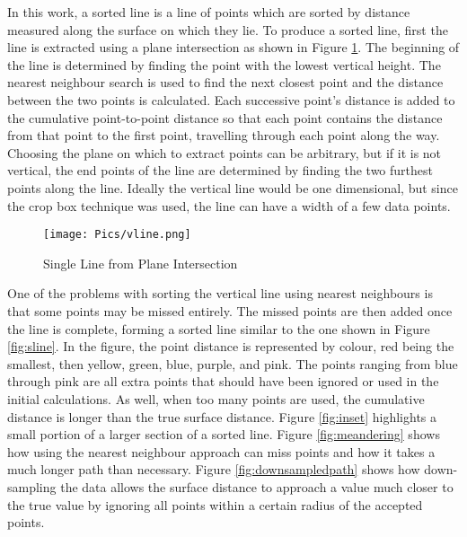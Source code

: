 In this work, a sorted line is a line of points which are sorted by distance measured along the surface on which they lie. To produce a sorted line, first the line is extracted using a plane intersection as shown in Figure \ref{fig:vline}. The beginning of the line is determined by finding the point with the lowest vertical height. The nearest neighbour search is used to find the next closest point and the distance between the two points is calculated. Each successive point's distance is added to the cumulative point-to-point distance so that each point contains the distance from that point to the first point, travelling through each point along the way. Choosing the plane on which to extract points can be arbitrary, but if it is not vertical, the end points of the line are determined by finding the two furthest points along the line. Ideally the vertical line would be one dimensional, but since the crop box technique was used, the line can have a width of a few data points.
\begin{figure}[!htb]
    \centering
    \texttt{[image: Pics/vline.png]}
    \caption{Single Line from Plane Intersection}
    \label{fig:vline}
\end{figure}
\clearpage
One of the problems with sorting the vertical line using nearest neighbours is that some points may be missed entirely. The missed points are then added once the line is complete, forming a sorted line similar to the one shown in Figure \ref{fig:sline}. In the figure, the point distance is represented by colour, red being the smallest, then yellow, green, blue, purple, and pink. The points ranging from blue through pink are all extra points that should have been ignored or used in the initial calculations. As well, when too many points are used, the cumulative distance is longer than the true surface distance. Figure \ref{fig:inset} highlights a small portion of a larger section of a sorted line. Figure \ref{fig:meandering} shows how using the nearest neighbour approach can miss points and how it takes a much longer path than necessary. Figure \ref{fig:downsampledpath} shows how down-sampling the data allows the surface distance to approach a value much closer to the true value by ignoring all points within a certain radius of the accepted points. \\


